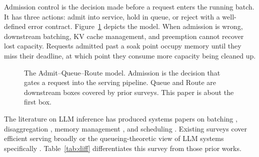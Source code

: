 \documentclass[10pt]{article} %
\theoremstyle{definition}
\begin{document}
Admission control is the decision made before a request enters the
running batch. It has three actions: admit into service, hold in queue,
or reject with a well-defined error contract. Figure~\ref{fig:aqr}
depicts the model. When admission is wrong, downstream batching, KV
cache management, and preemption cannot recover lost capacity. Requests
admitted past a soak point occupy memory until they miss their
deadline, at which point they consume more capacity being cleaned up.

\begin{figure}[htbp]
\centering
{}
\caption{The Admit--Queue--Route model. Admission is the decision that gates a request into the serving pipeline. Queue and Route are downstream boxes covered by prior surveys. This paper is about the first box.}
\label{fig:aqr}
\end{figure}

The literature on LLM inference has produced systems papers on batching
\citep{yu2022orca, agrawal2024sarathi}, disaggregation
\citep{zhong2024distserve, patel2024splitwise}, memory management
\citep{kwon2023pagedattention, qin2025mooncake}, and scheduling
\citep{sun2024llumnix, hong2025sola}. Existing surveys cover efficient
serving broadly \citep{zhen2025titans, li2024surveyllm,
heisler2025survey} or the queueing-theoretic view of LLM systems
specifically \citep{mitzenmacher2025queueing}. Table~\ref{tab:diff}
differentiates this survey from those prior works.
\end{document}
